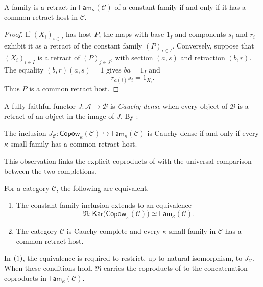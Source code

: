 \documentclass[runningheads,envcountsame]{llncs}
\newcommand{\Copow}{\mathsf{Copow}}
\newcommand{\Fam}{\mathsf{Fam}}
\newcommand{\Kar}{\mathsf{Kar}}
\newcommand{\Rlz}{\mathfrak R}
\begin{document}
\begin{lemma}
\label{lem:host}
A family is a retract in $\Fam_\kappa(\mathcal C)$ of a constant family if and only if it has a common retract host in $\mathcal C $.
\end{lemma}

\begin{proof}
If $(X_i)_{i\in I}$ has host $P$, the maps with base $1_I$ and components $s_i$ and $r_i$ exhibit it as a retract of the constant family $(P)_{i\in I}$. Conversely, suppose that $(X_i)_{i\in I}$ is a retract of $(P)_{j\in J}$, with section $(a,s)$ and retraction $(b,r)$. The equality $(b,r)(a,s)=1$ gives $ba=1_I$ and
$$
r_{a(i)}s_i=1_{X_i}.
$$
Thus $P$ is a common retract host.
\end{proof}

A fully faithful functor $J:\mathcal A\to\mathcal B$ is \emph{Cauchy dense} when every object of $\mathcal B$ is a retract of an object in the image of $J$. By :
\begin{lemma}
\label{lem:cauchy-dense}
 The inclusion $J_{\mathcal C}:\Copow_\kappa(\mathcal C)\hookrightarrow\Fam_\kappa(\mathcal C)$ is Cauchy dense if and only if every $\kappa$-small family has a common retract host. 
\end{lemma} 
This observation links the explicit coproducts of  with the universal comparison between the two completions.

\begin{theorem}
\label{thm:criterion}
For a category $\mathcal C$, the following are equivalent.
\begin{enumerate}
\item The constant-family inclusion extends to an equivalence
\begin{equation}\label{eq:fundamental-Karequivalence}
\Rlz:
\Kar\bigl(\Copow_\kappa(\mathcal C)\bigr)
\simeq
\Fam_\kappa(\mathcal C).
\end{equation}
\item The category $\mathcal C$ is Cauchy complete and every $\kappa$-small family in $\mathcal C$ has a common retract host.
\end{enumerate}
In $\textup{(1)}$, the equivalence is required to restrict, up to natural isomorphism, to $J_{\mathcal C}$. When these conditions hold, $\Rlz$ carries the coproducts of  to the concatenation coproducts in $\Fam_\kappa(\mathcal C)$.
\end{theorem}
\end{document}
